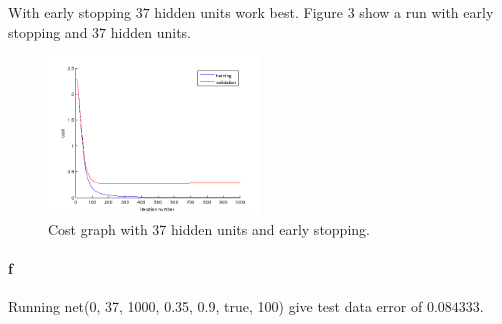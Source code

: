 \documentclass{article}
\begin{document}
With early stopping $37$ hidden units work best.
 Figure 3 show a run with early stopping and $37$ hidden units.

\begin{figure}[h!]
  \centering
    \includegraphics[width=0.5\textwidth]{pics/prob24e.png}
    \caption{Cost graph with 37 hidden units and early stopping.}
\end{figure}

\paragraph{f}

Running net(0, 37, 1000, 0.35, 0.9, true, 100) give test data error of
$0.084333$.
\end{document}
